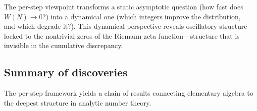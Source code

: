 \documentclass[11pt]{article}
\theoremstyle{definition}
\begin{document}
The per-step viewpoint transforms a static asymptotic question
(how fast does $W(N) \to 0$?) into a dynamical one (which integers
improve the distribution, and which degrade it?).  This dynamical
perspective reveals oscillatory structure locked to the nontrivial
zeros of the Riemann zeta function---structure that is invisible in the
cumulative discrepancy.


\subsection{Summary of discoveries}\label{sec:intro-results}

The per-step framework yields a chain of results connecting elementary
algebra to the deepest structure in analytic number theory.
\end{document}
